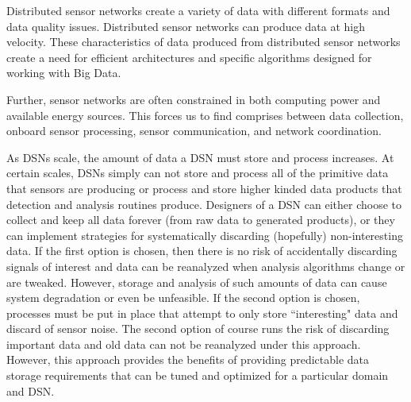 Distributed sensor networks create a variety of data with different formats and data quality issues. Distributed sensor networks can produce data at high velocity. These characteristics of data produced from distributed sensor networks create a need for efficient architectures and specific algorithms designed for working with Big Data.

Further, sensor networks are often constrained in both computing power and available energy sources. This forces us to find comprises between data collection, onboard sensor processing, sensor communication, and network coordination.

As DSNs scale, the amount of data a DSN must store and process increases. At certain scales, DSNs simply can not store and process all of the primitive data that sensors are producing or process and store higher kinded data products that detection and analysis routines produce. Designers of a DSN can either choose to collect and keep all data forever (from raw data to generated products), or they can implement strategies for systematically discarding (hopefully) non-interesting data. If the first option is chosen, then there is no risk of accidentally discarding signals of interest and data can be reanalyzed when analysis algorithms change or are tweaked. However, storage and analysis of such amounts of data can cause system degradation or even be unfeasible. If the second option is chosen, processes must be put in place that attempt to only store ``interesting" data and discard of sensor noise.  The second option of course runs the risk of discarding important data and old data can not be reanalyzed under this approach. However, this approach provides the benefits of providing predictable data storage requirements that can be tuned and optimized for a particular domain and DSN.

